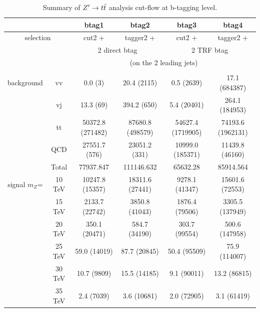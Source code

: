 \documentclass{cernrep}
\begin{document}
\begin{landscape}
\begin{table}[!htb]\centering
\begin{tabular}{|c|c|c|c|c|c|}
\hline
\hline
\multicolumn{2}{|c|}{}          & btag1 & btag2                      & btag3 & btag4                   \\
\hline
\multicolumn{2}{|c|}{selection} & cut2 + & tagger2 +                 & cut2 + & tagger2 +              \\
\multicolumn{2}{|c|}{}          & \multicolumn{2}{c|}{2 direct btag} & \multicolumn{2}{c|}{2 TRF btag} \\
\multicolumn{2}{|c|}{}          & \multicolumn{4}{c|}{(on the 2 leading jets)}                         \\
\multicolumn{2}{|c|}{}          & \multicolumn{4}{c|}{}                                                \\
\hline
\hline
background      & vv            & 0.0 (3)          & 20.4 (2115)      & 0.5 (2639)        & 17.1 (684387)     \\
                & vj            & 13.3 (69)        & 394.2 (650)      & 5.4 (20401)       & 264.1 (184953)    \\
                & tt            & 50372.8 (271482) & 87680.8 (498579) & 54627.4 (1719905) & 74193.6 (1962131) \\
                & QCD           & 27551.7 (576)    & 23051.2 (331)    & 10999.0 (185371)  & 11439.8 (46160)   \\
                & Total         & 77937.847        & 111146.632       & 65632.28          & 85914.564         \\
\hline
signal $m_{Z}$= & 10 TeV        & 10247.8 (15357)  & 18311.6 (27441)  & 9278.1 (41347)    & 15601.6 (72553)   \\
                & 15 TeV        & 2133.7 (22742)   & 3850.8 (41043)   & 1876.4 (79506)    & 3305.5 (137949)   \\
                & 20 TeV        & 350.1 (20471)    & 584.7 (34190)    & 303.7 (99554)     & 500.6 (147958)    \\
                & 25 TeV        & 59.0 (14019)     & 87.7 (20845)     & 50.4 (95509)      & 75.9 (114007)     \\
                & 30 TeV        & 10.7 (9809)      & 15.5 (14185)     & 9.1 (90011)       & 13.2 (86815)      \\
                & 35 TeV        & 2.4 (7039)       & 3.6 (10681)      & 2.0 (72905)       & 3.1 (61419)       \\
\hline
\hline
\end{tabular}
\caption{Summary of $Z^{\prime} \rightarrow t\bar{t}$ analysis cut-flow at b-tagging level.}
\label{tab:Zptt_cutflow_btag}
\end{table}
\end{landscape}
\end{document}
